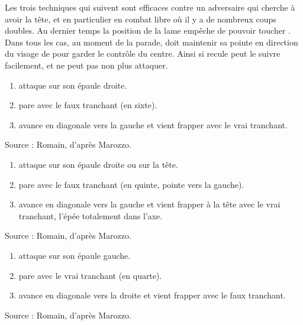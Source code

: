 Les trois techniques qui suivent sont efficaces contre un adversaire qui cherche à avoir la tête, et en particulier en combat libre où il y a de nombreux coups doubles.
Au dernier temps la position de la lame empêche \A de pouvoir toucher \D.
Dans tous les cas, au moment de la parade, \D doit maintenir sa pointe en direction du visage de \A pour garder le contrôle du centre.
Ainsi si \A recule \D peut le suivre facilement, et \A ne peut pas non plus attaquer.


\begin{technique}

\begin{enumerate}
	\item \A attaque \D sur son épaule droite.
	
	\item \D pare avec le faux tranchant (en sixte).
	
	\item \D avance en diagonale vers la gauche et vient frapper \A avec le vrai tranchant.
\end{enumerate}

Source : Romain, d'après Marozzo.

\end{technique}


\begin{technique}

\begin{enumerate}
	\item \A attaque \D sur son épaule droite ou sur la tête.
	
	\item \D pare avec le faux tranchant (en quinte, pointe vers la gauche).
	
	\item \D avance en diagonale vers la gauche et vient frapper \A à la tête avec le vrai tranchant, l'épée totalement dans l'axe.
\end{enumerate}

Source : Romain, d'après Marozzo.

\end{technique}


\begin{technique}

\begin{enumerate}
	\item \A attaque \D sur son épaule gauche.
	
	\item \D pare avec le vrai tranchant (en quarte).
	
	\item \D avance en diagonale vers la droite et vient frapper \A avec le faux tranchant.
\end{enumerate}

Source : Romain, d'après Marozzo.

\end{technique}


